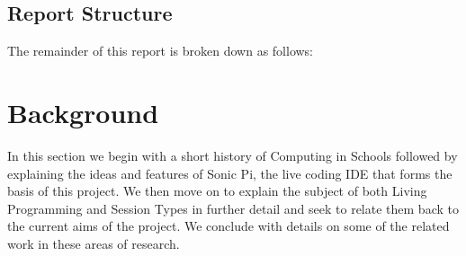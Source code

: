 \documentclass[11pt]{scrartcl}
\begin{document}

\subsection{Report Structure}
The remainder of this report is broken down as follows:


\newpage

\section{Background}
In this section we begin with a short history of Computing in Schools followed 
by explaining the ideas and features of Sonic Pi, the live coding IDE that forms 
the basis of this project. We then move on to explain the subject of both Living 
Programming and Session Types in further detail and seek to relate them back to 
the current aims of the project. We conclude with details on some of the related 
work in these areas of research.
\end{document}
